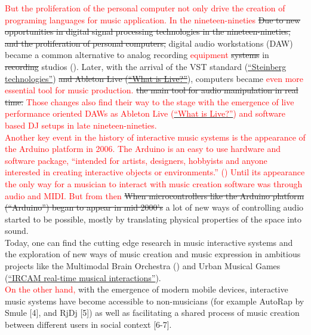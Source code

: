 \documentclass[a4paper,11pt]{article}
\begin{document}
\textcolor{red}{But the proliferation of the personal computer not only drive the creation of programing languages for music application. In the nineteen-nineties} \st{Due to new opportunities in digital signal processing technologies in the nineteen-nineties, and the proliferation of personal computers,} digital audio workstations (DAW) became a common alternative to analog recording \textcolor{red}{equipment} \st{systems} in \st{recording} studios (). Later, with the arrival of the VST standard (\href{http://www.steinberg.net/en/company/technologies.html}{``Steinberg technologies''}) \st{and Ableton Live (}\href{https://www.ableton.com/en/live/}{\st{``What is Live?''}}), computers became \textcolor{red}{even more essential tool for music production.} \st{the main tool for audio manipulation in real time.} \textcolor{red}{Those changes also find their way to the stage with the emergence of live performance oriented DAWs as Ableton Live (}\href{https://www.ableton.com/en/live/}{\textcolor{red}{``What is Live?''}}\textcolor{red}{) and software based DJ setups in late nineteen-nineties.} \\

\textcolor{red}{Another key event in the history of interactive music systems is the appearance of the Arduino platform in 2006. The Arduino is an easy to use hardware and software package, ``intended for artists, designers, hobbyists and anyone interested in creating interactive objects or environments.'' (}\textcolor{red}{) Until its appearance the only way for a musician to interact with music creation software was through audio and MIDI. But from then }\st{When microcontrollers like the Arduino platform (``Arduino'') began to appear in mid 2000's} a lot of new ways of controlling audio started to be possible, mostly by translating physical properties of the space into sound.\\

Today, one can find the cutting edge research in music interactive systems and the exploration of new ways of music creation and music expression in ambitious projects like the Multimodal Brain Orchestra (\href{http://specs.upf.edu/installation/2025}{}) and Urban Musical Games (\href{http://imtr.ircam.fr/imtr/IRCAM_Real-Time_Musical_Interactions}{``IRCAM real-time musical interactions''}).\\

\textcolor{red}{On the other hand, }with the emergence of modern mobile devices, interactive music systems have become accessible to non-musicians (for example AutoRap by Smule [4], and RjDj [5]) as well as facilitating a shared process of music creation between different users in social context [6-7].\\
\end{document}
